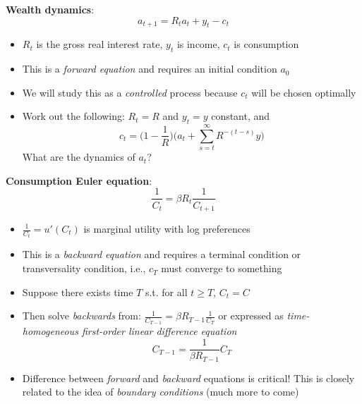 \documentclass[10pt]{beamer}
\begin{document}
\begin{frame}{}
\textbf{Wealth dynamics}:
\begin{equation*}
	a_{t+1} = R_t a_t + y_t - c_t
\end{equation*}
\begin{itemize}
	\item $R_t$ is the gross real interest rate, $y_t$ is income, $c_t$ is consumption
	
	\item This is a \textit{forward equation} and requires an initial condition $a_0$
	
	\item We will study this as a \textit{controlled} process because $c_t$ will be chosen optimally
	
	\item Work out the following: $R_t = R$ and $y_t = y$ constant, and  
	\begin{equation*}
		c_t = \bigg( 1 - \frac{1}{R} \bigg) \bigg(a_t + \sum_{s=t}^\infty R^{-(t-s)} y \bigg)
	\end{equation*}
	What are the dynamics of $a_t$?
\end{itemize}
\end{frame}


\begin{frame}{}
\textbf{Consumption Euler equation}:
\begin{equation*}
	\frac{1}{C_t} = \beta R_t\frac{1}{C_{t+1}}
\end{equation*}
\begin{itemize}
	\item $\frac{1}{C_t} = u'(C_t)$ is marginal utility with log preferences
	
	\item This is a \textit{backward equation} and requires a terminal condition or transversality condition, i.e., $c_T$ must converge to something
	
	\item Suppose there exists time $T$ s.t. for all $t \geq T$, $C_t = C$
	
	\item Then solve \textit{backwards} from: $\frac{1}{C_{T-1}} = \beta R_{T-1} \frac{1}{C_T}$ or expressed as \textit{time-homogeneous first-order linear difference equation}
	\begin{equation*}
		C_{T-1} = \frac{1}{\beta R_{T-1}} C_T
	\end{equation*}

	\item Difference between \textit{forward} and \textit{backward} equations is critical! This is closely related to the idea of \textit{boundary conditions} (much more to come)
\end{itemize}
\end{frame}
\end{document}
